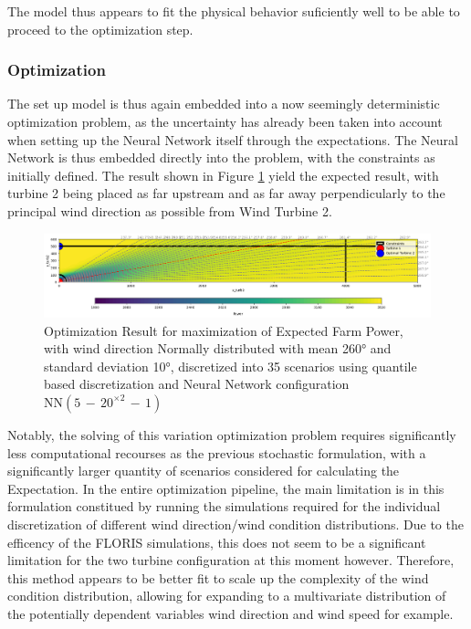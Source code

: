\documentclass[preprint,12pt]{elsarticle}
\begin{document}
The model thus appears to fit the physical behavior suficiently well to be able to proceed to the optimization step. 

\subsubsection{Optimization}

The set up model is thus again embedded into a now seemingly deterministic optimization problem, as the uncertainty has already been taken into account when setting up the Neural Network itself through the expectations. The Neural Network is thus embedded directly into the problem, with the constraints as initially defined. The result shown in Figure \ref{fig:stoch2_opti} yield the expected result, with turbine 2 being placed as far upstream and as far away perpendicularly to the principal wind direction as possible from Wind Turbine 2. 

\begin{figure}[h] 
	\centering
	\includegraphics[width=1\textwidth]{../figures/optimization/stoch2/stoch2_opti.png} 
	\caption{Optimization Result for maximization of Expected Farm Power, with wind direction Normally distributed with mean 260° and standard deviation 10°, discretized into 35 scenarios using quantile based discretization and Neural Network configuration $\text{NN}(5\,{-}\,20^{\times2}\,{-}\,1)$ }
	\label{fig:stoch2_opti}
\end{figure} 

Notably, the solving of this variation optimization problem requires significantly less computational recourses as the previous stochastic formulation, with a significantly larger quantity of scenarios considered for calculating the Expectation. In the entire optimization pipeline, the main limitation is in this formulation constitued by running the simulations required for the individual discretization of different wind direction/wind condition distributions. Due to the efficency of the FLORIS simulations, this does not seem to be a significant limitation for the two turbine configuration at this moment however. Therefore, this method appears to be better fit to scale up the complexity of the wind condition distribution, allowing for expanding to a multivariate distribution of the potentially dependent variables wind direction and wind speed for example. 
\end{document}
